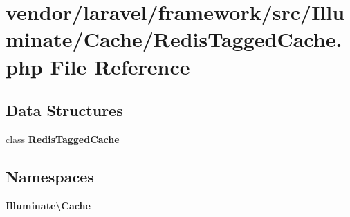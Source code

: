 \section{vendor/laravel/framework/src/\+Illuminate/\+Cache/\+Redis\+Tagged\+Cache.php File Reference}
\label{_redis_tagged_cache_8php}
\subsection*{Data Structures}
\begin{DoxyCompactItemize}
\item 
class {\bf Redis\+Tagged\+Cache}
\end{DoxyCompactItemize}
\subsection*{Namespaces}
\begin{DoxyCompactItemize}
\item 
 {\bf Illuminate\textbackslash{}\+Cache}
\end{DoxyCompactItemize}
